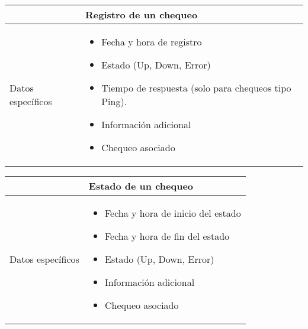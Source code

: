 \begin{center}
  
  \begin{tabularx}{\textwidth}{|l|X|}
    \hline

    & Registro de un chequeo \\

    \hline
    Datos específicos &

    \begin{itemize}
    \item Fecha y hora de registro
    \item Estado (Up, Down, Error)
    \item Tiempo de respuesta (solo para chequeos tipo Ping).
    \item Información adicional
    \item Chequeo asociado
    \end{itemize}
    \\
    
    \hline
    
  \end{tabularx}
\end{center}

\begin{center}
  
  \begin{tabularx}{\textwidth}{|l|X|}
    \hline

    & Estado de un chequeo \\

    \hline
    Datos específicos &

    \begin{itemize}
    \item Fecha y hora de inicio del estado
    \item Fecha y hora de fin del estado
    \item Estado (Up, Down, Error)
    \item Información adicional
    \item Chequeo asociado
    \end{itemize}
    \\
    
    \hline
    
  \end{tabularx}
\end{center}

